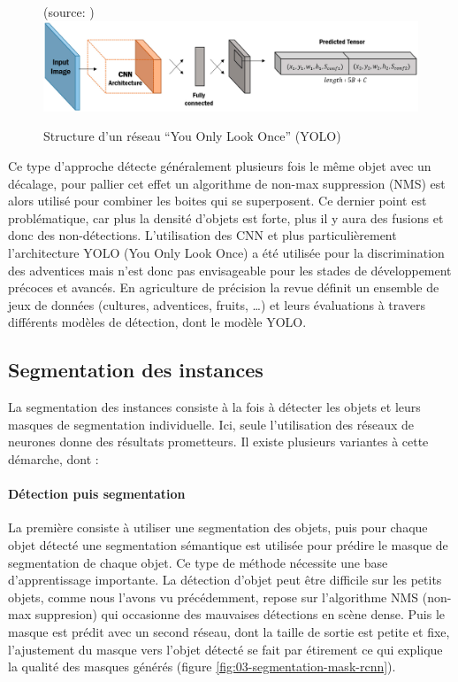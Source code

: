 \documentclass[../thesis.tex]{subfiles}
\begin{document}
    \begin{figure}[H]
        \centering
        {\scriptsize (source: \cite{app10020612})} \\
        \includegraphics[width=\linewidth]{img/biblio/segmentation-object}
        \caption{Structure d'un réseau ``You Only Look Once'' (YOLO)}
        \label{fig:03-segmentation-object}
    \end{figure}
    
    Ce type d'approche détecte généralement plusieurs fois le même objet avec un décalage, pour pallier cet effet un algorithme de non-max suppression (NMS) est alors utilisé pour combiner les boites qui se superposent. Ce dernier point est problématique, car plus la densité d'objets est forte, plus il y aura des fusions et donc des non-détections. L'utilisation des CNN et plus particulièrement l'architecture YOLO (You Only Look Once) a été utilisée pour la discrimination des adventices \cite{rs13122288} mais n'est donc pas envisageable pour les stades de développement précoces et avancés. En agriculture de précision la revue \cite{s19051058} définit un ensemble de jeux de données (cultures, adventices, fruits, \dots) et leurs évaluations à travers différents modèles de détection, dont le modèle YOLO.
    
    \newpage
    \subsection{Segmentation des instances}
    
    La segmentation des instances consiste à la fois à détecter les objets et leurs masques de segmentation individuelle. Ici, seule l'utilisation des réseaux de neurones donne des résultats prometteurs. Il existe plusieurs variantes \cite{Hafiz_2020} à cette démarche, dont :
    
    \paragraph{Détection puis segmentation} La première consiste à utiliser une segmentation des objets, puis pour chaque objet détecté une segmentation sémantique est utilisée pour prédire le masque de segmentation de chaque objet. Ce type de méthode nécessite une base d'apprentissage importante. La détection d'objet peut être difficile sur les petits objets, comme nous l'avons vu précédemment, repose sur l'algorithme NMS (non-max suppresion) qui occasionne des mauvaises détections en scène dense. Puis le masque est prédit avec un second réseau, dont la taille de sortie est petite et fixe, l'ajustement du masque vers l'objet détecté se fait par étirement ce qui explique la qualité des masques générés (figure \ref{fig:03-segmentation-mask-rcnn}).
    
\end{document}
